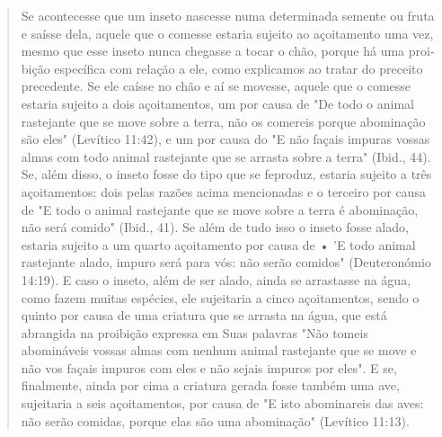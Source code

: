 \begin{quote}
Se acontecesse que um inseto nascesse numa determinada semente ou fruta
e saísse dela, aquele que o comesse estaria sujeito ao açoitamento uma
vez, mesmo que esse inseto nunca chegasse a tocar o chão, porque há uma
proi­bição específica com relação a ele, como explicamos ao tratar do
preceito prece­dente. Se ele caísse no chão e aí se movesse, aquele que
o comesse estaria sujeito a dois açoitamentos, um por causa de "De todo
o animal rastejante que se move sobre a terra, não os comereis porque
abominação são eles" (Levítico 11:42), e um por causa do "E não façais
impuras vossas almas com todo animal rastejante que se arrasta sobre a
terra" (Ibid., 44). Se, além disso, o inseto fosse do tipo que se
feproduz, estaria sujeito a três açoitamentos: dois pelas razões acima
mencio­nadas e o terceiro por causa de "E todo o animal rastejante que
se move sobre a terra é abominação, não será comido" (Ibid., 41). Se
além de tudo isso o inseto fosse alado, estaria sujeito a um quarto
açoitamento por causa de • 'E todo animal rastejante alado, impuro será
para vós: não serão comidos" (Deuteronómio 14:19). E caso o inseto, além
de ser alado, ainda se arrastasse na água, como fazem muitas espécies,
ele sujeitaria a cinco açoitamentos, sendo o quinto por causa de uma
criatura que se arrasta na água, que está abrangida na proibição
expressa em Suas palavras "Não tomeis abomináveis vossas almas com
nenhum animal rastejante que se move e não vos façais impuros com eles e
não sejais impuros por eles". E se, finalmente, ainda por cima a
criatura gerada fosse também uma ave, sujeita­ria a seis açoitamentos,
por causa de "E isto abominareis das aves: não serão co­midas, porque
elas são uma abominação" (Levítico 11:13).


\end{quote}
